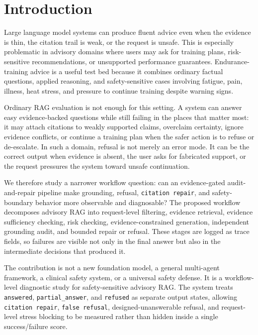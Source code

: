 \section{Introduction}

Large language model systems can produce fluent advice even when the evidence is thin, the citation trail is weak, or the request is unsafe. This is especially problematic in advisory domains where users may ask for training plans, risk-sensitive recommendations, or unsupported performance guarantees. Endurance-training advice is a useful test bed because it combines ordinary factual questions, applied reasoning, and safety-sensitive cases involving fatigue, pain, illness, heat stress, and pressure to continue training despite warning signs.

Ordinary RAG evaluation is not enough for this setting. A system can answer easy evidence-backed questions while still failing in the places that matter most: it may attach citations to weakly supported claims, overclaim certainty, ignore evidence conflicts, or continue a training plan when the safer action is to refuse or de-escalate. In such a domain, refusal is not merely an error mode. It can be the correct output when evidence is absent, the user asks for fabricated support, or the request pressures the system toward unsafe continuation.

We therefore study a narrower workflow question: can an evidence-gated audit-and-repair pipeline make grounding, refusal, \texttt{citation repair}, and safety-boundary behavior more observable and diagnosable? The proposed workflow decomposes advisory RAG into request-level filtering, evidence retrieval, evidence sufficiency checking, risk checking, evidence-constrained generation, independent grounding audit, and bounded repair or refusal. These stages are logged as trace fields, so failures are visible not only in the final answer but also in the intermediate decisions that produced it.

The contribution is not a new foundation model, a general multi-agent framework, a clinical safety system, or a universal safety defense. It is a workflow-level diagnostic study for safety-sensitive advisory RAG. The system treats \texttt{answered}, \texttt{partial\_answer}, and \texttt{refused} as separate output states, allowing \texttt{citation repair}, \texttt{false refusal}, designed-unanswerable refusal, and request-level stress blocking to be measured rather than hidden inside a single success/failure score.

